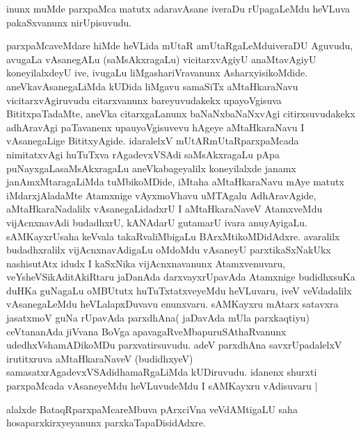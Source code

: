 \begin{artha}
inunx muMde parxpaMca matutx adaravAsane iveraDu rUpagaLeMdu heVLuva
pakaSxvanunx nirUpisuvudu.
\end{artha}


\begin{center}

\end{center}

\begin{artha}
parxpaMcaveMdare hiMde heVLida mUtaR amUtaRgaLeMduiveraDU Aguvudu,
avugaLa vAsanegALu (saMsAkxragaLu) vicitarxvAgiyU anaMtavAgiyU
koneyilalxdeyU ive, ivugaLu liMgashariVravanunx
AsharxyisikoMdide. aneVkavAsanegaLiMda kUDida liMgavu samaSiTx
aMtaHkaraNavu vicitarxvAgiruvudu citarxvanunx bareyuvudakekx
upayoVgisuva BititxpaTadaMte, aneVka citarxgaLanunx baNaNxbaNaNxvAgi
citirxsuvudakekx adhAravAgi paTavanenx upauyoVgisuvevu hAgeye
aMtaHkaraNavu I vAsanegaLige BititxyAgide. idaralelxV
mUtARmUtaRparxpaMcada nimitatxvAgi huTuTxva rAgadevxVSAdi
saMsAkxragaLu pApa puNayxgaLasaMsAkxragaLu aneVkabageyalilx
koneyilalxde janamx janAmxMtaragaLiMda tuMbikoMDide, iMtaha
aMtaHkaraNavu mAye matutx iMdarxjAladaMte Atamxnige vAyxmoVhavu
uMTAgalu AdhAravAgide, aMtaHkaraNadalilx vAsanegaLidadxrU I
aMtaHkaraNaveV AtamxveMdu vijAcnxnavAdi budadhxrU, kANAdarU gutamarU
ivara anuyAyigaLu. sAMKayxrUsaha keVvala takaRvaliMbigaLu
BArxMtikoMDidAdxre. avaralilx budadhxralilx vijAcnxnavAdigaLu oMdoMdu
vAsaneyU parxtikaSxNakUkx nashisutAtx idudx I kaSxNika vijAcnxnavanunx
Atamxvenuvaru, veYsheVSikAditAkiRtaru jaDanAda darxvayxrUpavAda
Atamxnige budidhxsuKa duHKa guNagaLu oMBUtutx huTuTxtatxveyeMdu
heVLuvaru, iveV veVdadalilx vAsanegaLeMdu heVLalapxDuvavu
enunxvaru. sAMKayxru mAtarx satavxra jasatxmoV guNa rUpavAda
parxdhAna( jaDavAda mUla parxkaqtiyu) ceVtananAda jiVvana BoVga
apavagaRveMbapuruSAthaRvanunx udedhxVshamADikoMDu
parxvatirsuvudu. adeV parxdhAna savxrUpadalelxV irutitxruva
aMtaHkaraNaveV (budidhxyeV) samasatxrAgadevxVSAdidhamaRgaLiMda
kUDiruvudu. idanenx shurxti parxpaMcada vAsaneyeMdu heVLuvudeMdu I
sAMKayxru vAdisuvaru |

alalxde BataqRparxpaMcareMbuva pArxciVna veVdAMtigaLU saha
hosaparxkirxyeyanunx parxkaTapaDisidAdxre.
\end{artha}


\begin{center}


\end{center}


